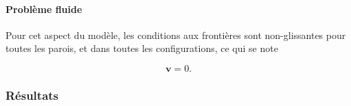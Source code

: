 

\paragraph{Problème fluide}
Pour cet aspect du modèle, les conditions aux frontières sont non-glissantes pour toutes les parois, et dans toutes les configurations, ce qui se note

\begin{equation}
	\mathbf v = 0.
\end{equation}


\subsubsection{Résultats}%



